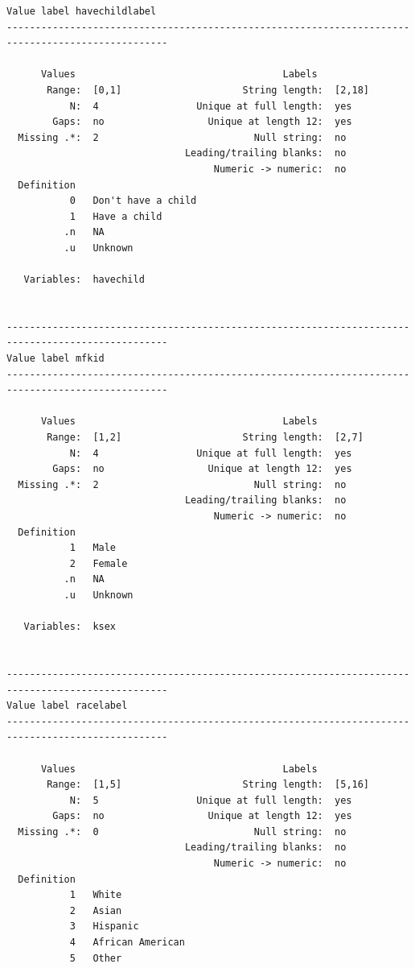 \documentclass[
]{book}
\begin{document}
\begin{verbatim}
Value label havechildlabel 
--------------------------------------------------------------------------------------------------

      Values                                    Labels
       Range:  [0,1]                     String length:  [2,18]
           N:  4                 Unique at full length:  yes
        Gaps:  no                  Unique at length 12:  yes
  Missing .*:  2                           Null string:  no
                               Leading/trailing blanks:  no
                                    Numeric -> numeric:  no
  Definition
           0   Don't have a child
           1   Have a child
          .n   NA
          .u   Unknown

   Variables:  havechild


--------------------------------------------------------------------------------------------------
Value label mfkid 
--------------------------------------------------------------------------------------------------

      Values                                    Labels
       Range:  [1,2]                     String length:  [2,7]
           N:  4                 Unique at full length:  yes
        Gaps:  no                  Unique at length 12:  yes
  Missing .*:  2                           Null string:  no
                               Leading/trailing blanks:  no
                                    Numeric -> numeric:  no
  Definition
           1   Male
           2   Female
          .n   NA
          .u   Unknown

   Variables:  ksex


--------------------------------------------------------------------------------------------------
Value label racelabel 
--------------------------------------------------------------------------------------------------

      Values                                    Labels
       Range:  [1,5]                     String length:  [5,16]
           N:  5                 Unique at full length:  yes
        Gaps:  no                  Unique at length 12:  yes
  Missing .*:  0                           Null string:  no
                               Leading/trailing blanks:  no
                                    Numeric -> numeric:  no
  Definition
           1   White
           2   Asian
           3   Hispanic
           4   African American
           5   Other


\end{verbatim}
\end{document}
